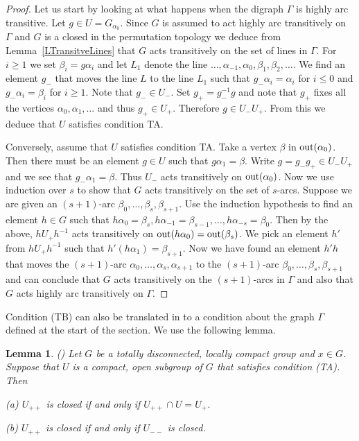 \documentclass{emsprocart}
\newtheorem{lemma}[theorem]{Lemma}
\theoremstyle{definition}
\begin{document}
\begin{proof}
Let us start by looking at what happens when the digraph $\Gamma$ is
highly arc transitive.
Let $g\in U=G_{\alpha_0}$.  Since $G$ is assumed to act highly arc
transitively on $\Gamma$ and $G$ is a closed in the permutation
topology we deduce from Lemma~\ref{LTransitveLines} that $G$ acts
transitively on the set of lines in $\Gamma$.  For $i\geq 1$ we set
$\beta_i=g\alpha_i$ and let $L_1$ denote the line $\ldots,
\alpha_{-1}, \alpha_0, \beta_1, \beta_2, \ldots$.
We find an element $g_-$ that moves the line $L$ to
the line $L_1$ such that $g_-\alpha_i=\alpha_i$ for $i\leq 0$ and
$g_-\alpha_i=\beta_i$ for $i\geq 1$.  Note that $g_-\in U_-$.
Set $g_+=g_-^{-1}g$ and note that
$g_+$ fixes all the vertices $\alpha_0, \alpha_1, \ldots$ and thus
$g_+\in U_+$.  Therefore $g\in U_-U_+$.  From this we
deduce that $U$ satisfies condition TA.

Conversely, assume that $U$ satisfies condition TA.  Take a vertex $\beta$ in
${\mbox{${\rm out}$}}(\alpha_0)$.  Then there must be an element $g\in U$ such that
$g\alpha_1=\beta$.  Write $g=g_-g_+\in U_-U_+$ and we see that
$g_-\alpha_1=\beta$.  Thus $U_-$ acts transitively on
${\mbox{${\rm out}$}}(\alpha_0)$.
Now we use induction over $s$ to show that $G$
acts transitively on the set of $s$-arcs.  Suppose we are given an
 $(s+1)$-arc $\beta_0, \ldots, \beta_s, \beta_{s+1}$.  Use the induction
hypothesis to find an element $h\in G$ such that $h\alpha_0=\beta_s,
h\alpha_{-1}=\beta_{s-1},\ldots, h\alpha_{-s}=\beta_0$.  Then by the above,
$hU_+h^{-1}$ acts transitively on ${\mbox{${\rm out}$}}(h\alpha_0)={\mbox{${\rm out}$}}(\beta_s)$.  We
pick an element $h'$ from $hU_+h^{-1}$ such that
$h'(h\alpha_1)=\beta_{s+1}$.  Now we have found an element $h'h$ that
moves the $(s+1)$-arc  $\alpha_0, \ldots, \alpha_s, \alpha_{s+1}$
to the $(s+1)$-arc $\beta_0, \ldots, \beta_s, \beta_{s+1}$ and can
conclude that $G$ acts transitively on the $(s+1)$-arcs in $\Gamma$ and
also that $G$ acts highly arc transitively on $\Gamma$.
\end{proof}

\bigskip

Condition (TB) can also be translated in to a condition about the graph
$\Gamma$ defined at the start of the section.
We use the following lemma.

\begin{lemma}{\rm (\cite[Lemma 3]{Willis1994})}
Let $G$ be a totally disconnected,
  locally compact group and $x\in G$.  Suppose that $U$ is a compact,
  open subgroup of $G$ that satisfies condition (TA).  Then

(a) $U_{++}$ is closed if and only if $U_{++}\cap U=U_+$.

(b) $U_{++}$ is closed if and only if $U_{--}$ is closed.
\end{lemma}
\end{document}
